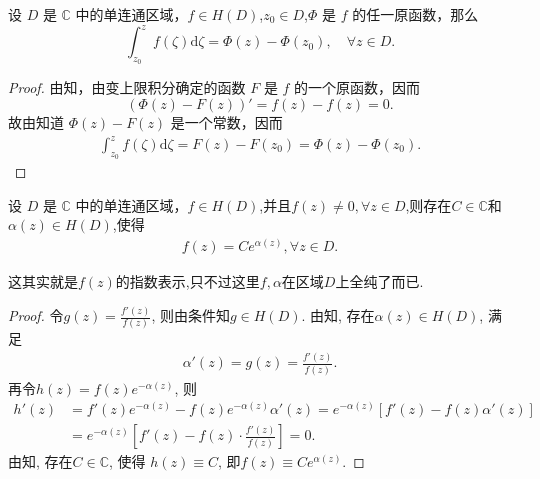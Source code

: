 \documentclass[../../main.tex]{subfiles}%
\begin{document}
\begin{theorem}[复积分的微积分基本定理]\label{theorem:复积分的微积分基本定理}
设 \( D \) 是 \( \mathbb{C} \) 中的单连通区域，\( f \in H(D) \),$z_0\in D$,\( \Phi \) 是 \( f \) 的任一原函数，那么
\[
\int_{z_0}^{z} f(\zeta) \mathrm{d}\zeta  = \Phi(z) - \Phi(z_0),\quad \forall z\in D.
\]
\end{theorem}
\begin{proof}
由知，由变上限积分确定的函数 \( F \) 是 \( f \) 的一个原函数，因而
\[
(\Phi(z) - F(z))' = f(z) - f(z) = 0.
\]
故由知道 \( \Phi(z) - F(z) \) 是一个常数，因而
\begin{align*}
\int_{z_0}^{z} f(\zeta) \mathrm{d}\zeta  = F(z) - F(z_0) = \Phi(z) - \Phi(z_0).
\end{align*}
\end{proof}

\begin{proposition}\label{proposition:单连通区域内无零点的解析函数必为指数函数}
设 \( D \) 是 \( \mathbb{C} \) 中的单连通区域，\( f \in H(D) \),并且$f(z)\neq 0,\forall z\in D$,则存在$C\in \mathbb{C}$和$\alpha(z)\in H(D)$,使得
\begin{align*}
f(z)=Ce^{\alpha(z)},\forall z\in D.
\end{align*}
\end{proposition}
\begin{remark}
这其实就是$f(z)$的指数表示,只不过这里$f,\alpha$在区域$D$上全纯了而已.
\end{remark}
\begin{proof}
令$g\left( z \right) =\frac{f'\left( z \right)}{f\left( z \right)}$, 则由条件知$g\in H(D)$. 由知, 存在$\alpha \left( z \right)\in H(D)$, 满足
\begin{align*}
\alpha '\left( z \right) =g\left( z \right) =\frac{f'\left( z \right)}{f\left( z \right)}.
\end{align*}
再令$h\left( z \right) =f\left( z \right) e^{-\alpha \left( z \right)}$, 则
\begin{align*}
h'\left( z \right)&=f'\left( z \right) e^{-\alpha \left( z \right)}-f\left( z \right) e^{-\alpha \left( z \right)}\alpha '\left( z \right) =e^{-\alpha \left( z \right)}\left[ f'\left( z \right) -f\left( z \right) \alpha '\left( z \right) \right] \\
&=e^{-\alpha \left( z \right)}\left[ f'\left( z \right) -f\left( z \right) \cdot \frac{f'\left( z \right)}{f\left( z \right)} \right] =0.
\end{align*}
由知, 存在$C\in \mathbb{C}$, 使得
$h\left( z \right) \equiv C$, 即$f\left( z \right) \equiv Ce^{\alpha \left( z \right)}$.
\end{proof}
\end{document}
